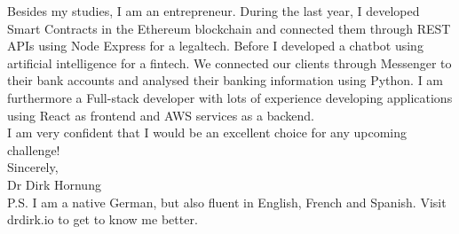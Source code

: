 \documentclass[11pt]{article}
\begin{document}
\noindent Besides my studies, I am an entrepreneur. During the last year, I developed
Smart Contracts in the Ethereum blockchain and connected them through REST APIs
using Node Express for a legaltech. Before I developed a chatbot using
artificial intelligence for a fintech. We connected our clients through
Messenger to their bank accounts and analysed their banking information using
Python. I am furthermore a Full-stack developer with lots of experience developing
applications using React as frontend and AWS services as a backend.  \\

\noindent I am very confident that I would be an excellent choice for any
upcoming challenge! \\

\noindent Sincerely, \\
Dr Dirk Hornung \\

\noindent P.S. I am a native German, but also fluent in English, French and
Spanish. Visit drdirk.io to get to know me better.
\newpage

	
\end{document}
